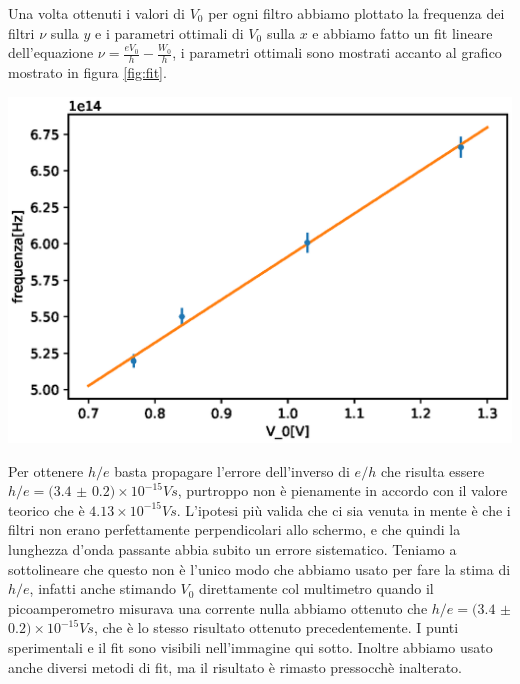 \documentclass[10pt,a4paper]{article}
\begin{document}
Una volta ottenuti i valori di $V_0$ per ogni filtro abbiamo plottato la frequenza dei filtri $\nu$ sulla $y$ e i parametri ottimali di $V_0$ sulla $x$ e abbiamo fatto un fit lineare dell'equazione $\nu=\frac{eV_0}h-\frac {W_0}h$, i parametri ottimali sono mostrati accanto al grafico mostrato in figura \ref{fig:fit}.\newline  

\begin{minipage}{.6\linewidth}
		\centering
		\includegraphics[width=\linewidth]{immagini/fit.eps}
		\label{fig:fit}
	\end{minipage}
	\begin{minipage}{.4\linewidth}
		
		\label{tab:fit}
\end{minipage}\newline\newline
\newline

Per ottenere $h/e$ basta propagare l'errore dell'inverso di $e/h$ che risulta essere $h/e=(3.4$ $\pm$ $0.2)\times 10^{-15} Vs$, purtroppo non è pienamente in accordo con il valore teorico che è $4.13\times 10^{-15}Vs$. L'ipotesi più valida che ci sia venuta in mente è che i filtri non erano perfettamente perpendicolari allo schermo, e che quindi la lunghezza d'onda passante abbia subito un errore sistematico.\newline
Teniamo a sottolineare che questo non è l'unico modo che abbiamo usato per fare la stima di $h/e$, infatti anche stimando $V_0$ direttamente col multimetro quando il picoamperometro misurava una corrente nulla abbiamo ottenuto che $h/e=(3.4$ $\pm$ $0.2)\times 10^{-15}Vs$, che è lo stesso risultato ottenuto precedentemente. I punti sperimentali e il fit sono visibili nell'immagine qui sotto.\newline
Inoltre abbiamo usato anche diversi metodi di fit, ma il risultato è rimasto pressocchè inalterato.
\end{document}

